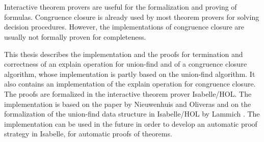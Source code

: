 \chapter{\abstractname}

Interactive theorem provers are useful for the formalization and proving of formulas. Congruence closure is already used by most theorem provers for solving decision procedures. However, the implementations of congruence closure are usually not formally proven for completeness.

This thesis describes the implementation and the proofs for termination and correctness of an explain operation for union-find and of a congruence closure algorithm, whose implementation is partly based on the union-find algorithm. It also contains an implementation of the explain operation for congruence closure. The proofs are formalized in the interactive theorem prover Isabelle/HOL. The implementation is based on the paper by Nieuwenhuis and Oliveras \cite{Nieuwenhuis} and on the formalization of the union-find data structure in Isabelle/HOL by Lammich \cite{unionfind-isabelle}. The implementation can be used in the future in order to develop an automatic proof strategy in Isabelle, for automatic proofs of theorems.
